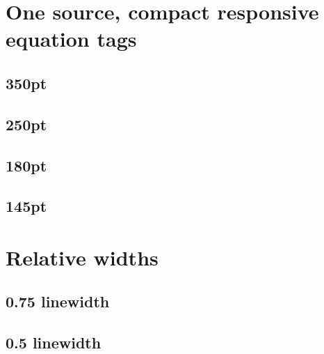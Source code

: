 \documentclass{article}
\begin{document}
\section*{One source, compact responsive equation tags}

\subsection*{350pt}
\noindent\begin{minipage}{350pt}\end{minipage}\par
\subsection*{250pt}
\noindent\begin{minipage}{250pt}\end{minipage}\par
\subsection*{180pt}
\noindent\begin{minipage}{180pt}\end{minipage}\par
\subsection*{145pt}
\noindent\begin{minipage}{145pt}\end{minipage}\par
\clearpage
\section*{Relative widths}
\subsection*{0.75 linewidth}
\noindent\begin{minipage}{.75\linewidth}\end{minipage}\par
\subsection*{0.5 linewidth}
\noindent\begin{minipage}{.5\linewidth}\end{minipage}\par
\end{document}
